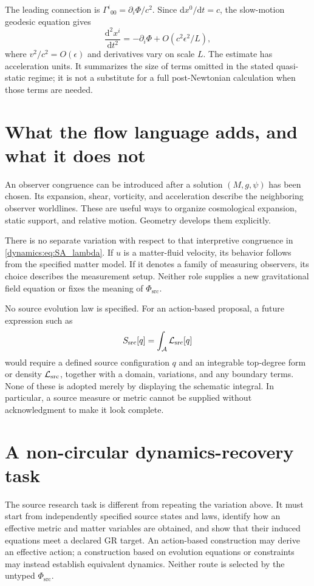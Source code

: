 \documentclass[11pt,oneside]{report}
\newcommand{\Sub}{\mathcal A}
\newcommand{\PhiSrc}{\Phi_{\mathrm{src}}}
\newcommand{\Ph}{\Phi}
\newcommand{\dd}{\mathrm d}
\theoremstyle{remark}
\numberwithin{definition}{chapter}
\numberwithin{proposition}{chapter}
\numberwithin{remark}{chapter}
\begin{document}
The leading connection is $\Gamma^i{}_{00}=\partial_i\Ph/c^2$. Since $\dd x^0/\dd t=c$, the slow-motion geodesic equation gives
\begin{equation}
\frac{\dd^2x^i}{\dd t^2}=-\partial_i\Ph+O(c^2\epsilon^2/L),
\label{dynamics:eq:newtonianlimit}
\end{equation}
where $v^2/c^2=O(\epsilon)$ and derivatives vary on scale $L$. The estimate has acceleration units. It summarizes the size of terms omitted in the stated quasi-static regime; it is not a substitute for a full post-Newtonian calculation when those terms are needed.

\section{What the flow language adds, and what it does not}
An observer congruence can be introduced after a solution $(M,g,\psi)$ has been chosen. Its expansion, shear, vorticity, and acceleration describe the neighboring observer worldlines. These are useful ways to organize cosmological expansion, static support, and relative motion. Geometry develops them explicitly.

There is no separate variation with respect to that interpretive congruence in \eqref{dynamics:eq:SA_lambda}. If $u$ is a matter-fluid velocity, its behavior follows from the specified matter model. If it denotes a family of measuring observers, its choice describes the measurement setup. Neither role supplies a new gravitational field equation or fixes the meaning of $\PhiSrc$.

No source evolution law is specified. For an action-based proposal, a future expression such as
\begin{equation}
S_{\rm src}[q]=\int_{\Sub}\mathcal L_{\rm src}[q]
\label{dynamics:eq:substrateaction}
\end{equation}
would require a defined source configuration $q$ and an integrable top-degree form or density $\mathcal L_{\rm src}$, together with a domain, variations, and any boundary terms. None of these is adopted merely by displaying the schematic integral. In particular, a source measure or metric cannot be supplied without acknowledgment to make it look complete.

\section{A non-circular dynamics-recovery task}
The source research task is different from repeating the variation above. It must start from independently specified source states and laws, identify how an effective metric and matter variables are obtained, and show that their induced equations meet a declared GR target. An action-based construction may derive an effective action; a construction based on evolution equations or constraints may instead establish equivalent dynamics. Neither route is selected by the untyped $\PhiSrc$.
\end{document}
